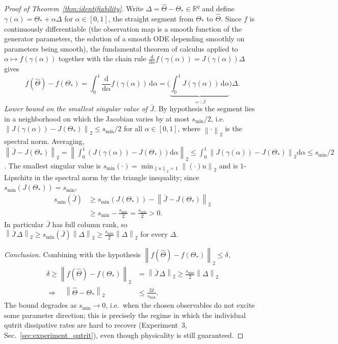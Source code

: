 \documentclass[twocolumn,aps,prxquantum,superscriptaddress,nofootinbib,floatfix,longbibliography]{revtex4-2}
\newcommand{\R}{\mathbb{R}}
\newcommand{\dd}{\mathrm{d}}
\newcommand{\norm}[1]{\left\lVert #1 \right\rVert}
\newcommand{\Thetahat}{\widehat{\Theta}}
\begin{document}
\begin{proof}[Proof of Theorem~\ref{thm:identifiability}]
Write $\Delta=\Thetahat-\Theta_*\in\R^q$ and define $\gamma(\alpha)=\Theta_*+\alpha\Delta$ for $\alpha\in[0,1]$, the straight segment from $\Theta_*$ to $\Thetahat$. Since $f$ is continuously differentiable (the observation map is a smooth function of the generator parameters, the solution of a smooth ODE depending smoothly on parameters being smooth), the fundamental theorem of calculus applied to $\alpha\mapsto f(\gamma(\alpha))$ together with the chain rule $\tfrac{\dd}{\dd\alpha}f(\gamma(\alpha))=J(\gamma(\alpha))\Delta$ gives
\[
f(\Thetahat)-f(\Theta_*)=\int_0^1\frac{\dd}{\dd\alpha}f(\gamma(\alpha))\,\dd\alpha=\Big(\underbrace{\int_0^1 J(\gamma(\alpha))\,\dd\alpha}_{=: \bar J}\Big)\Delta .
\]
\emph{Lower bound on the smallest singular value of $\bar J$.} By hypothesis the segment lies in a neighborhood on which the Jacobian varies by at most $s_{\min}/2$, i.e.\ $\norm{J(\gamma(\alpha))-J(\Theta_*)}_2\le s_{\min}/2$ for all $\alpha\in[0,1]$, where $\norm{\cdot}_2$ is the spectral norm. Averaging, $\norm{\bar J-J(\Theta_*)}_2=\norm{\int_0^1(J(\gamma(\alpha))-J(\Theta_*))\dd\alpha}_2\le\int_0^1\norm{J(\gamma(\alpha))-J(\Theta_*)}_2\dd\alpha\le s_{\min}/2$. The smallest singular value is $s_{\min}(\cdot)=\min_{\norm{u}_2=1}\norm{(\cdot)u}_2$ and is $1$-Lipschitz in the spectral norm by the triangle inequality; since $s_{\min}(J(\Theta_*))=s_{\min}$,
\begin{equation*}
\begin{aligned}
s_{\min}(\bar J)&\ge s_{\min}(J(\Theta_*))-\norm{\bar J-J(\Theta_*)}_2\\
&\ge s_{\min}-\tfrac{s_{\min}}{2}=\tfrac{s_{\min}}{2}>0.
\end{aligned}
\end{equation*}
In particular $\bar J$ has full column rank, so $\norm{\bar J\,\Delta}_2\ge s_{\min}(\bar J)\norm{\Delta}_2\ge\tfrac{s_{\min}}{2}\norm{\Delta}_2$ for every $\Delta$.

\emph{Conclusion.} Combining with the hypothesis $\norm{f(\Thetahat)-f(\Theta_*)}_2\le\delta$,
\begin{equation*}
\begin{aligned}
\delta\ge\norm{f(\Thetahat)-f(\Theta_*)}_2&=\norm{\bar J\,\Delta}_2\ge\tfrac{s_{\min}}{2}\norm{\Delta}_2\\
\Longrightarrow\quad \norm{\Thetahat-\Theta_*}_2&\le\frac{2\delta}{s_{\min}}.
\end{aligned}
\end{equation*}
The bound degrades as $s_{\min}\to0$, i.e.\ when the chosen observables do not excite some parameter direction; this is precisely the regime in which the individual qutrit dissipative rates are hard to recover (Experiment~3, Sec.~\ref{sec:experiment_qutrit}), even though physicality is still guaranteed.
\end{proof}
\end{document}
